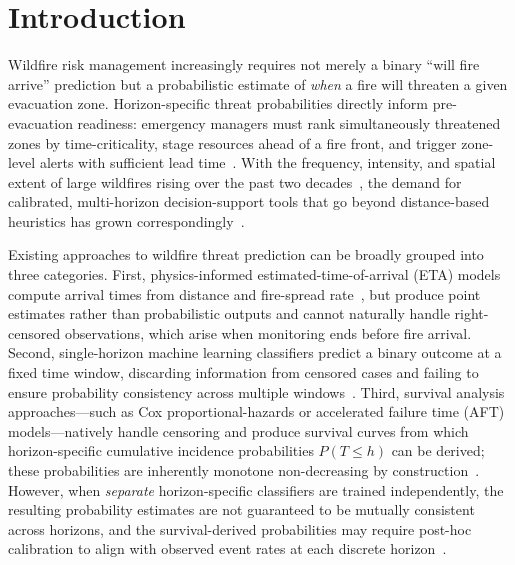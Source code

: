 \documentclass[fire,article,submit,pdftex]{../Definitions/mdpi}
\begin{document}

\section{Introduction}\label{sec:introduction}

Wildfire risk management increasingly requires not merely a binary ``will fire arrive'' prediction but a probabilistic estimate of \emph{when} a fire will threaten a given evacuation zone.
Horizon-specific threat probabilities directly inform pre-evacuation readiness: emergency managers must rank simultaneously threatened zones by time-criticality, stage resources ahead of a fire front, and trigger zone-level alerts with sufficient lead time~\cite{Finney2001,Xi2019,Stephens2018}.
With the frequency, intensity, and spatial extent of large wildfires rising over the past two decades~\cite{Jain2022,Cunningham2024,Turco2023,Luo2024,Jones2022,Kolden2024,Higuera2021}, the demand for calibrated, multi-horizon decision-support tools that go beyond distance-based heuristics has grown correspondingly~\cite{Radeloff2023,Tonini2020}.

Existing approaches to wildfire threat prediction can be broadly grouped into three categories.
First, physics-informed estimated-time-of-arrival (ETA) models compute arrival times from distance and fire-spread rate~\cite{Finney2001,Cruz2003}, but produce point estimates rather than probabilistic outputs and cannot naturally handle right-censored observations, which arise when monitoring ends before fire arrival.
Second, single-horizon machine learning classifiers predict a binary outcome at a fixed time window, discarding information from censored cases and failing to ensure probability consistency across multiple windows~\cite{Jaafari2019,Gigovic2019,Chen2024wui}.
Third, survival analysis approaches---such as Cox proportional-hazards or accelerated failure time (AFT) models---natively handle censoring and produce survival curves from which horizon-specific cumulative incidence probabilities $P(T \leq h)$ can be derived; these probabilities are inherently monotone non-decreasing by construction~\cite{Wiegrebe2024,Taylor2013}.
However, when \emph{separate} horizon-specific classifiers are trained independently, the resulting probability estimates are not guaranteed to be mutually consistent across horizons, and the survival-derived probabilities may require post-hoc calibration to align with observed event rates at each discrete horizon~\cite{VanCalster2019}.
\end{document}
